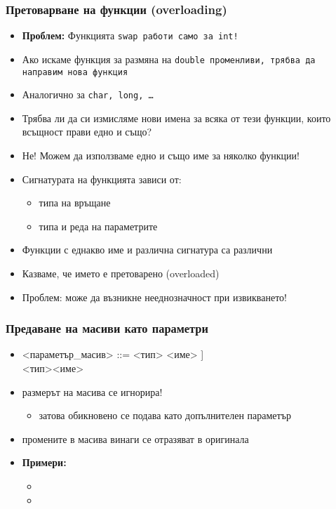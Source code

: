 \documentclass{beamer}
\begin{document}
\begin{frame}
  \frametitle{Претоварване на функции (overloading)}

  \begin{itemize}[<+->]
  \item \textbf{Проблем:} Функцията \tt{swap} работи само за \tt{int}!
  \item Ако искаме функция за размяна на \tt{double} променливи, трябва да направим нова функция 
  \item Аналогично за \tt{char}, \tt{long}, \ldots
  \item Трябва ли да си измисляме нови имена за всяка от тези функции, които всъщност прави едно и също?
  \item \alert{Не!} Можем да използваме едно и също име за няколко функции!
  \item Сигнатурата на функцията зависи от:
    \begin{itemize}[<.->]
    \item типа на връщане
    \item типа и реда на параметрите
    \end{itemize}
  \item Функции с еднакво име и различна сигнатура са различни
  \item Казваме, че името е \alert{претоварено} (overloaded)
  \item \alert{Проблем}: може да възникне нееднозначност при извикването!
  \end{itemize}
\end{frame}

\begin{frame}
  \frametitle{Предаване на масиви като параметри}

  \small
  \begin{itemize}[<+->]
  \item{} <параметър\_масив> ::= <тип> <име> \tta[[<константен\_израз>]\tta]\\
    \hspace{26ex}<тип>\tta* <име>
  \item размерът на масива \alert{се игнорира}!
    \begin{itemize}
    \item затова обикновено се подава като допълнителен параметър
    \end{itemize}
  \item промените в масива винаги се отразяват в оригинала
  \item \textbf{Примери:}
    \begin{itemize}
    \item {}
    \item {}
    \end{itemize}
  \end{itemize}
\end{frame}
\end{document}
